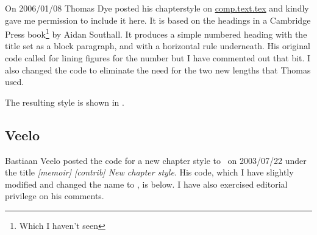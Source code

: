     On 2006/01/08 Thomas Dye posted his  
chapterstyle on \url{comp.text.tex} and kindly gave me permission to 
include it here. It is based on the headings in a Cambridge Press 
book\footnote{Which I haven't seen} by Aidan Southall.
It produces a simple numbered heading with the title set as a block paragraph,
and with a horizontal rule underneath. His original code called for lining
figures for the number but I have commented out that bit. I also changed
the code to eliminate the need for the two new lengths that Thomas used.

\begin{lcode}
\end{lcode}

The resulting style is shown in .


\subsection{Veelo}

    Bastiaan Veelo 
posted the code for a new chapter style to \pixctt\ on 2003/07/22 under the
title \textit{[memoir] [contrib] New chapter style}. His code, which
I have slightly modified and changed the name to ,
is below. I have also exercised editorial privilege on his comments.

